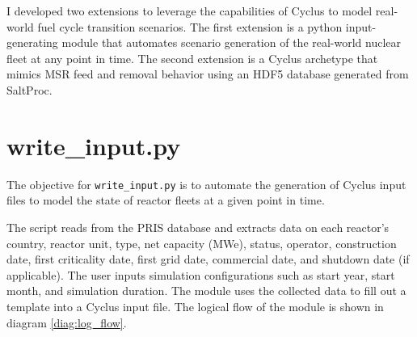 I developed two extensions to leverage 
the capabilities of Cyclus to model
real-world fuel cycle transition scenarios.
The first extension is a python input-generating module
that automates scenario generation of the real-world 
nuclear fleet at any point in time. The second extension
is a Cyclus archetype that mimics \gls{MSR} feed and removal
behavior using an HDF5 database generated from SaltProc.

\section{write\_input.py}
\label{sec:writeinput}
The objective for \texttt{write\_input.py}
is to automate the generation of Cyclus input files
to model the state of reactor fleets at a given
point in time.

The script reads from the \gls{PRIS} database \cite{iaea_nuclear_2018}
and extracts data on each reactor's country, reactor unit,
type, net capacity (MWe), status, operator, construction date,
first criticality date, first grid date, commercial date,
and shutdown date (if applicable). The user inputs simulation
configurations such as start year, start month, and
simulation duration. The module uses the collected data to
fill out a template into a Cyclus input file. The logical flow of the module is 
shown in diagram \ref{diag:log_flow}.


